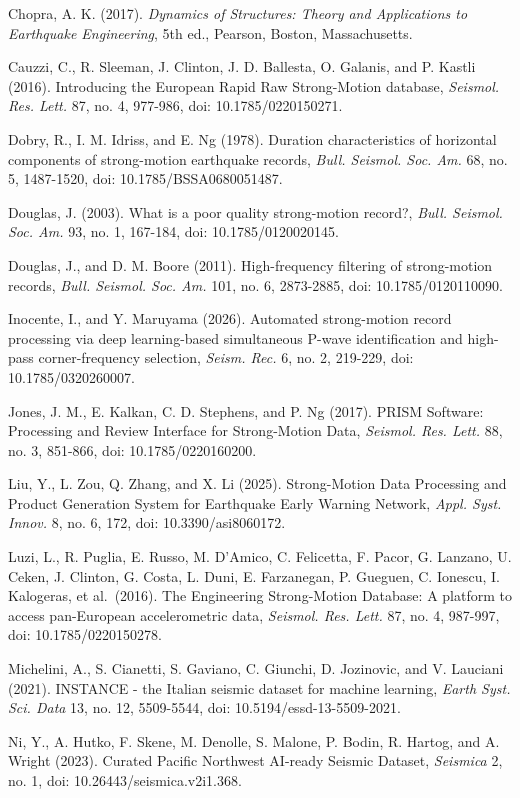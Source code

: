 \documentclass[12pt,letterpaper]{article}
\begin{document}
Chopra, A. K. (2017). \emph{Dynamics of Structures: Theory and Applications to Earthquake Engineering}, 5th ed., Pearson, Boston, Massachusetts.

Cauzzi, C., R. Sleeman, J. Clinton, J. D. Ballesta, O. Galanis, and P. Kastli (2016). Introducing the European Rapid Raw Strong-Motion database, \emph{Seismol. Res. Lett.} 87, no. 4, 977-986, doi: 10.1785/0220150271.

Dobry, R., I. M. Idriss, and E. Ng (1978). Duration characteristics of horizontal components of strong-motion earthquake records, \emph{Bull. Seismol. Soc. Am.} 68, no. 5, 1487-1520, doi: 10.1785/BSSA0680051487.

Douglas, J. (2003). What is a poor quality strong-motion record?, \emph{Bull. Seismol. Soc. Am.} 93, no. 1, 167-184, doi: 10.1785/0120020145.

Douglas, J., and D. M. Boore (2011). High-frequency filtering of strong-motion records, \emph{Bull. Seismol. Soc. Am.} 101, no. 6, 2873-2885, doi: 10.1785/0120110090.

Inocente, I., and Y. Maruyama (2026). Automated strong-motion record processing via deep learning-based simultaneous P-wave identification and high-pass corner-frequency selection, \emph{Seism. Rec.} 6, no. 2, 219-229, doi: 10.1785/0320260007.

Jones, J. M., E. Kalkan, C. D. Stephens, and P. Ng (2017). PRISM Software: Processing and Review Interface for Strong-Motion Data, \emph{Seismol. Res. Lett.} 88, no. 3, 851-866, doi: 10.1785/0220160200.

Liu, Y., L. Zou, Q. Zhang, and X. Li (2025). Strong-Motion Data Processing and Product Generation System for Earthquake Early Warning Network, \emph{Appl. Syst. Innov.} 8, no. 6, 172, doi: 10.3390/asi8060172.

Luzi, L., R. Puglia, E. Russo, M. D'Amico, C. Felicetta, F. Pacor, G. Lanzano, U. Ceken, J. Clinton, G. Costa, L. Duni, E. Farzanegan, P. Gueguen, C. Ionescu, I. Kalogeras, et al.~(2016). The Engineering Strong-Motion Database: A platform to access pan-European accelerometric data, \emph{Seismol. Res. Lett.} 87, no. 4, 987-997, doi: 10.1785/0220150278.

Michelini, A., S. Cianetti, S. Gaviano, C. Giunchi, D. Jozinovic, and V. Lauciani (2021). INSTANCE - the Italian seismic dataset for machine learning, \emph{Earth Syst. Sci. Data} 13, no. 12, 5509-5544, doi: 10.5194/essd-13-5509-2021.

Ni, Y., A. Hutko, F. Skene, M. Denolle, S. Malone, P. Bodin, R. Hartog, and A. Wright (2023). Curated Pacific Northwest AI-ready Seismic Dataset, \emph{Seismica} 2, no. 1, doi: 10.26443/seismica.v2i1.368.
\end{document}
